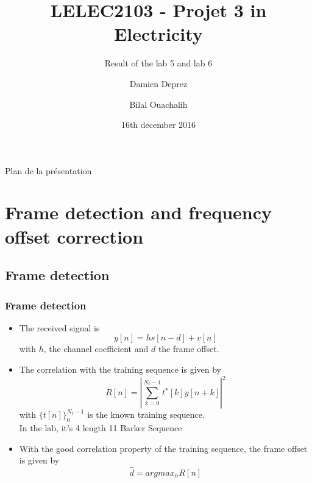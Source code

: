 \documentclass[11pt]{beamer}
\title{LELEC2103 - Projet 3 in Electricity}
\subtitle[\ldots]{Result of the lab 5 and lab 6}
\author[D. Deprez\and B. Ouachalih]{Damien Deprez\and Bilal Ouachalih}
\institute{EPL}
\date{16th december 2016}
\begin{document}
{
	\begin{frame}[noframenumbering]
		\titlepage
	\end{frame}
} 

{
	\begin{frame}[noframenumbering]{Plan de la présentation}
		\tableofcontents
	\end{frame}
}

\section{Frame detection and frequency offset correction}

\subsection{Frame detection}

\begin{frame}
\frametitle{Frame detection}
\begin{itemize}
\item The received signal is
\begin{equation}
y[n] = hs[n-d] + v[n]
\end{equation}
with $h$, the channel coefficient and $d$ the frame offset.
\item The correlation with the training sequence is given by
\begin{equation}
R[n] = \left| \sum_{k=0}^{N_t-1} t^*[k]y[n+k] \right|^2
\end{equation}
with $\{t[n]\}_0^{N_t-1}$ is the known training sequence. \\
In the lab, it's 4 length 11 Barker Sequence
\item With the good correlation property of the training sequence, the frame offset is given by 
\begin{equation}
\hat{d} = argmax_n{R[n]}
\end{equation}
\end{itemize}

\end{frame}
\end{document}

